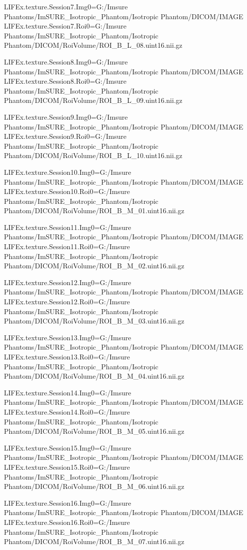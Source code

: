 LIFEx.texture.Session7.Img0=G:/Imsure Phantoms/ImSURE_Isotropic_Phantom/Isotropic Phantom/DICOM/IMAGE
LIFEx.texture.Session7.Roi0=G:/Imsure Phantoms/ImSURE_Isotropic_Phantom/Isotropic Phantom/DICOM/RoiVolume/ROI_B_L_08.uint16.nii.gz

LIFEx.texture.Session8.Img0=G:/Imsure Phantoms/ImSURE_Isotropic_Phantom/Isotropic Phantom/DICOM/IMAGE
LIFEx.texture.Session8.Roi0=G:/Imsure Phantoms/ImSURE_Isotropic_Phantom/Isotropic Phantom/DICOM/RoiVolume/ROI_B_L_09.uint16.nii.gz

LIFEx.texture.Session9.Img0=G:/Imsure Phantoms/ImSURE_Isotropic_Phantom/Isotropic Phantom/DICOM/IMAGE
LIFEx.texture.Session9.Roi0=G:/Imsure Phantoms/ImSURE_Isotropic_Phantom/Isotropic Phantom/DICOM/RoiVolume/ROI_B_L_10.uint16.nii.gz

LIFEx.texture.Session10.Img0=G:/Imsure Phantoms/ImSURE_Isotropic_Phantom/Isotropic Phantom/DICOM/IMAGE
LIFEx.texture.Session10.Roi0=G:/Imsure Phantoms/ImSURE_Isotropic_Phantom/Isotropic Phantom/DICOM/RoiVolume/ROI_B_M_01.uint16.nii.gz

LIFEx.texture.Session11.Img0=G:/Imsure Phantoms/ImSURE_Isotropic_Phantom/Isotropic Phantom/DICOM/IMAGE
LIFEx.texture.Session11.Roi0=G:/Imsure Phantoms/ImSURE_Isotropic_Phantom/Isotropic Phantom/DICOM/RoiVolume/ROI_B_M_02.uint16.nii.gz

LIFEx.texture.Session12.Img0=G:/Imsure Phantoms/ImSURE_Isotropic_Phantom/Isotropic Phantom/DICOM/IMAGE
LIFEx.texture.Session12.Roi0=G:/Imsure Phantoms/ImSURE_Isotropic_Phantom/Isotropic Phantom/DICOM/RoiVolume/ROI_B_M_03.uint16.nii.gz

LIFEx.texture.Session13.Img0=G:/Imsure Phantoms/ImSURE_Isotropic_Phantom/Isotropic Phantom/DICOM/IMAGE
LIFEx.texture.Session13.Roi0=G:/Imsure Phantoms/ImSURE_Isotropic_Phantom/Isotropic Phantom/DICOM/RoiVolume/ROI_B_M_04.uint16.nii.gz

LIFEx.texture.Session14.Img0=G:/Imsure Phantoms/ImSURE_Isotropic_Phantom/Isotropic Phantom/DICOM/IMAGE
LIFEx.texture.Session14.Roi0=G:/Imsure Phantoms/ImSURE_Isotropic_Phantom/Isotropic Phantom/DICOM/RoiVolume/ROI_B_M_05.uint16.nii.gz

LIFEx.texture.Session15.Img0=G:/Imsure Phantoms/ImSURE_Isotropic_Phantom/Isotropic Phantom/DICOM/IMAGE
LIFEx.texture.Session15.Roi0=G:/Imsure Phantoms/ImSURE_Isotropic_Phantom/Isotropic Phantom/DICOM/RoiVolume/ROI_B_M_06.uint16.nii.gz

LIFEx.texture.Session16.Img0=G:/Imsure Phantoms/ImSURE_Isotropic_Phantom/Isotropic Phantom/DICOM/IMAGE
LIFEx.texture.Session16.Roi0=G:/Imsure Phantoms/ImSURE_Isotropic_Phantom/Isotropic Phantom/DICOM/RoiVolume/ROI_B_M_07.uint16.nii.gz

